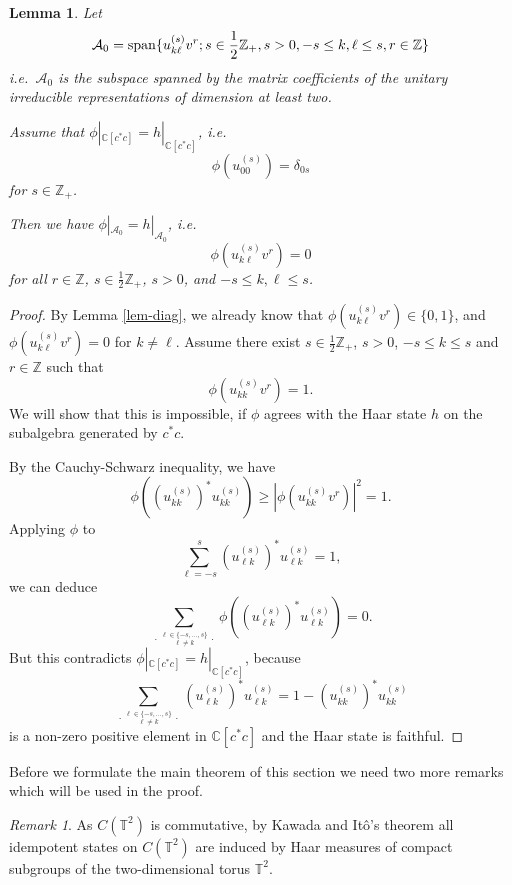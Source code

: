 \documentclass[12pt]{amsart}
\newtheorem{lemma}[theorem]{Lemma}
\theoremstyle{definition}
\theoremstyle{remark}
\newtheorem{remark}[theorem]{Remark}
\numberwithin{equation}{section}
\begin{document}
\begin{lemma}\label{lem-haar2}
Let
\[
\mathcal{A}_0 = {\rm span}\{u^{(s)}_{k\ell}v^r;s\in\frac{1}{2}\mathbb{Z}_+,
s>0, -s\le k,\ell\le s,r\in\mathbb{Z}\}
\]
i.e.\ $\mathcal{A}_0$ is the subspace spanned by the matrix coefficients of the unitary irreducible 
representations of dimension at least two.

Assume that $\phi|_{\mathbb{C}[c^*c]}=
h|_{\mathbb{C}[c^*c]}$, i.e.\
\[
\phi(u^{(s)}_{00})=\delta_{0s}
\]
for $s\in\mathbb{Z}_+$.

Then we have $\phi|_{\mathcal{A}_0}=h|_{\mathcal{A}_0} $, i.e.
\[
\phi\left(u^{(s)}_{k\ell}v^r\right)=0
\]
for all $r\in \mathbb{Z}$, $s\in\frac{1}{2}\mathbb{Z}_+$, $s>0$, and $-s\le
k,\ell\le s$.
\end{lemma}
\begin{proof}
By Lemma \ref{lem-diag}, we already know that
$\phi(u^{(s)}_{k\ell}v^r)\in\{0,1\}$, and $\phi(u^{(s)}_{k\ell}v^r)=0$  for
$k\not=\ell$. Assume there exist $s\in\frac{1}{2}\mathbb{Z}_+$, $s>0$, $-s\le
k\le s$ and $r\in\mathbb{Z}$ such that
\[
\phi(u^{(s)}_{kk}v^r)=1.
\]
We will show that this is impossible, if $\phi$ agrees with the Haar state $h$
on the subalgebra generated by $c^*c$.

By the Cauchy-Schwarz inequality, we have
\[
\phi\left((u^{(s)}_{kk})^*u^{(s)}_{kk}\right)\ge
\left|\phi(u^{(s)}_{kk}v^r)\right|^2 = 1.
\]
Applying $\phi$ to
\[
\sum_{\ell=-s}^s (u^{(s)}_{\ell k})^*u^{(s)}_{\ell k} =1,
\]
we can deduce
\[
\sum_{\genfrac{.}{.}{0pt}{}{\ell\in\{-s,\ldots,s\}}{\ell\not=k}} \phi\left((u^{(s)}_{\ell
  k})^*u^{(s)}_{\ell k}\right) =0.
\]
But this contradicts $\phi|_{\mathbb{C}[c^*c]}=
h|_{\mathbb{C}[c^*c]}$, because
\[
\sum_{\genfrac{.}{.}{0pt}{}{\ell\in\{-s,\ldots,s\}}{\ell\not=k}}
(u^{(s)}_{\ell
  k})^*u^{(s)}_{\ell k} = 1- (u^{(s)}_{kk})^*u^{(s)}_{kk}
\]
is a non-zero positive element in $\mathbb{C}[c^*c]$ and the Haar
state is faithful.
\end{proof}

Before we formulate the main theorem of this section we need two more remarks which will be used in  the proof.

\begin{remark}
As $C(\mathbb{T}^2)$ is commutative, by Kawada and
It\^o's theorem all idempotent states on $C(\mathbb{T}^2)$ are induced by Haar
measures of compact subgroups of the two-dimensional torus $\mathbb{T}^2$.
\end{remark}
\end{document}
